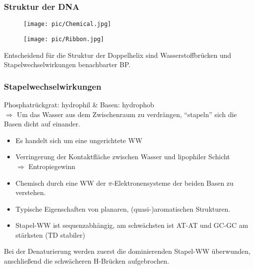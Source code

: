 \begin{frame}
\frametitle{Struktur der DNA}
\vspace{0.5cm}
\centering
\begin{minipage}{4.5cm}
\begin{figure}[h]
	\centering
		\texttt{[image: pic/Chemical.jpg]}
\end{figure}
\centering
	\cite{BIO09}
	\end{minipage}
	\begin{minipage}{4.5cm}
\begin{figure}[h]
	\centering
		\texttt{[image: pic/Ribbon.jpg]}
\end{figure}
\centering
	\cite{BIO09}
	\end{minipage}
	\centering
	
	\vspace{0.3cm}
	\small Entscheidend für die Struktur der Doppelhelix sind Wasserstoffbrücken und Stapelwechselwirkungen benachbarter BP.\\
	\end{frame}
	
	\begin{frame}
	\frametitle{Stapelwechselwirkungen}
	\small
Phosphatrückgrat: hydrophil \& Basen: hydrophob\\
	$\Rightarrow$ Um das Wasser aus dem Zwischenraum zu verdrängen, "`stapeln"' sich die Basen dicht auf einander.
	\begin{itemize}
	\item Es handelt sich um eine ungerichtete WW
	\item Verringerung der Kontaktfläche zwischen Wasser und lipophiler Schicht \\ $\Rightarrow$ Entropiegewinn
	\item Chemisch durch eine WW der $\pi$-Elektronensysteme der beiden Basen zu verstehen.
	\item Typische Eigenschaften von planaren, (quasi-)aromatischen Strukturen.
	\item Stapel-WW ist sequenzabhängig, am schwächsten ist AT-AT	und GC-GC am stärksten (TD stabiler)
	\end{itemize}
	\begin{block}{}
	Bei der Denaturierung werden zuerst die dominierenden Stapel-WW überwunden, anschließend die schwächeren H-Brücken aufgebrochen.
	\end{block}
	
	\end{frame}
	
